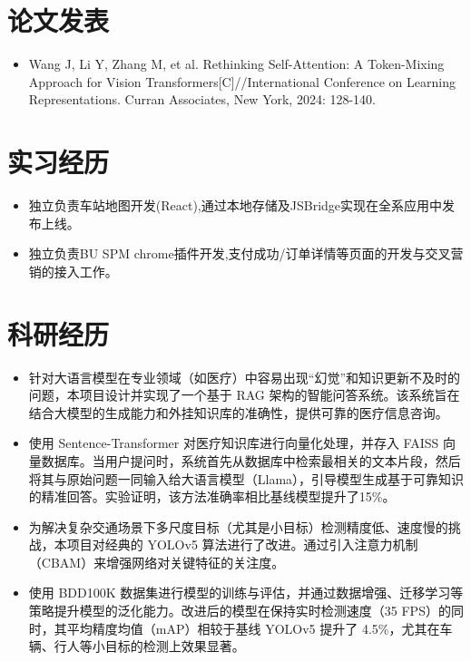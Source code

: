 \documentclass{cls/resume}
\begin{document}
\section{论文发表}
\begin{itemize}
    \item Wang J, Li Y, Zhang M, et al. Rethinking Self-Attention: A Token-Mixing Approach for Vision Transformers[C]//International Conference on Learning Representations. Curran Associates, New York, 2024: 128-140.
\end{itemize}


\section{实习经历}
\begin{itemize}
    \item 独立负责车站地图开发(React),通过本地存储及JSBridge实现在全系应用中发布上线。
    \item 独立负责BU SPM chrome插件开发,支付成功/订单详情等页面的开发与交叉营销的接入工作。
\end{itemize}

\section{科研经历}
\begin{itemize}
  \item 针对大语言模型在专业领域（如医疗）中容易出现“幻觉”和知识更新不及时的问题，本项目设计并实现了一个基于 RAG 架构的智能问答系统。该系统旨在结合大模型的生成能力和外挂知识库的准确性，提供可靠的医疗信息咨询。
  \item 使用 Sentence-Transformer 对医疗知识库进行向量化处理，并存入 FAISS 向量数据库。当用户提问时，系统首先从数据库中检索最相关的文本片段，然后将其与原始问题一同输入给大语言模型（Llama），引导模型生成基于可靠知识的精准回答。实验证明，该方法准确率相比基线模型提升了15\%。
\end{itemize}

\begin{itemize}
  \item 为解决复杂交通场景下多尺度目标（尤其是小目标）检测精度低、速度慢的挑战，本项目对经典的 YOLOv5 算法进行了改进。通过引入注意力机制（CBAM）来增强网络对关键特征的关注度。
  \item 使用 BDD100K 数据集进行模型的训练与评估，并通过数据增强、迁移学习等策略提升模型的泛化能力。改进后的模型在保持实时检测速度（35 FPS）的同时，其平均精度均值（mAP）相较于基线 YOLOv5 提升了 4.5\%，尤其在车辆、行人等小目标的检测上效果显著。
\end{itemize}
\end{document}
